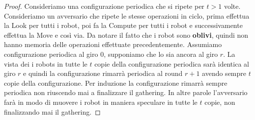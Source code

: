 

\begin{proof}
Consideriamo una configurazione periodica che si ripete per $t>1$ volte. Consideriamo un avversario che ripete le stesse operazioni in ciclo, prima effettua la Look per tutti i robot, poi fa la Compute per tutti i robot e successivamente effettua la Move e così via. Da notare il fatto che i robot sono \textbf{oblivi}, quindi non hanno memoria delle operazioni effettuate precedentemente. Assumiamo configurazione periodica al giro 0, supponiamo che lo sia ancora al giro $r$. La vista dei i robots in tutte le $t$ copie della configurazione periodica sarà identica al giro $r$ e quindi la configurazione rimarrà periodica al round $r+1$ avendo sempre $t$ copie della configurazione. Per induzione la configurazione rimarrà sempre periodica non riuscendo mai a finalizzare il gathering. In altre parole l'avversario farà in modo di muovere i robot in maniera speculare in tutte le $t$ copie, non finalizzando mai il gathering.
\end{proof}

